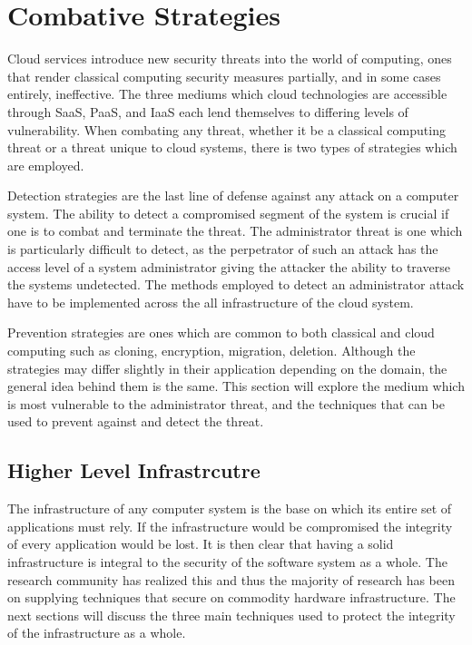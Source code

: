 \section{Combative Strategies}
\label{overview}

Cloud services introduce new security threats into the world of computing, ones that render classical computing security measures partially, and in some cases entirely, ineffective. The three mediums which cloud technologies are accessible through SaaS, PaaS, and IaaS each lend themselves to differing levels of vulnerability.\cite{theoharidou}\cite{subashini} When combating any threat, whether it be a classical computing threat or a threat unique to cloud systems, there is two types of strategies which are employed.

Detection strategies are the last line of defense against any attack on a computer system. The ability to detect a compromised segment of the system is crucial if one is to combat and terminate the threat. The administrator threat is one which is particularly difficult to detect, as the perpetrator of such an attack has the access level of a system administrator giving the attacker the ability to traverse the systems undetected. The methods employed to detect an administrator attack have to be implemented across the all infrastructure of the cloud system.\cite{dawoud}

Prevention strategies are ones which are common to both classical and cloud computing such as cloning, encryption, migration, deletion. Although the strategies may differ slightly in their application depending on the domain, the general idea behind them is the same.
This section will explore the medium which is most vulnerable to the administrator threat, and the techniques that can be used to prevent against and detect the threat.


\subsection{Higher Level Infrastrcutre}
\label{hlInfrastructure}

The infrastructure of any computer system is the base on which its entire set of applications must rely. If the infrastructure would be compromised the integrity of every application would be lost. It is then clear that having a solid infrastructure is integral to the security of the software system as a whole. The research community has realized this and thus the majority of research has been on supplying techniques that secure on commodity hardware infrastructure. The next sections will discuss the three main techniques used to protect the integrity of the infrastructure as a whole.

